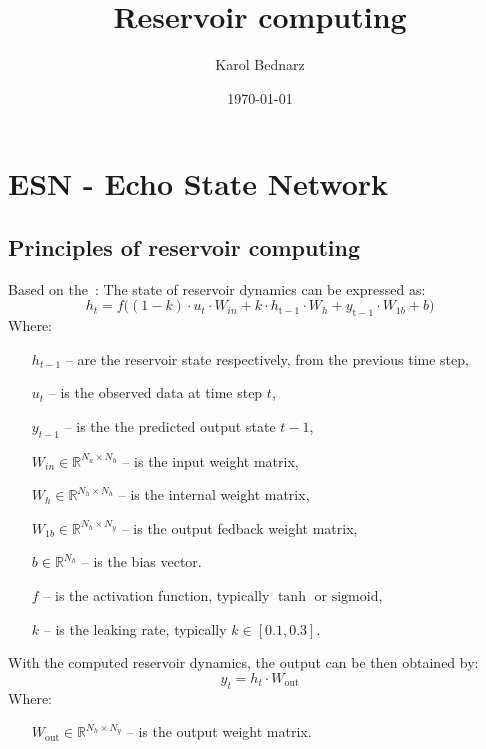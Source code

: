 \documentclass[11pt, oneside]{article}
\title{Reservoir computing}
\author{Karol Bednarz}
\date{\today}
\begin{document}
\maketitle
\tableofcontents

\vspace{.25in}

\newcommand{\Todo}[1]{\textcolor                {red}{\textbf{TODO:} #1}}

\section{ESN - Echo State Network}


\subsection{Principles of reservoir computing}
Based on the~\cite{Bai2023}:
The state of reservoir dynamics can be expressed as:
\begin{equation}
    h_t = f \big((1-k) \cdot u_t \cdot W_{in} + k\cdot h_{\mathrm{t-1}} \cdot W_h + y_{\mathrm{t-1}} \cdot W_{1b} + b \big)
\end{equation}
Where:
\begin{itemize}[noitemsep, leftmargin=4cm, label={}]
    \item [\(h_{t-1}\)] -- are the reservoir state respectively, from the previous time step,
    \item [\(u_t\)] -- is the observed data at time step \(t\),
    \item [\(y_{t-1}\)] -- is the the predicted output state \(t-1\),
    \item [\(W_{in} \in \mathbb{R}^{N_u \times N_h}\)] -- is the input weight matrix,
    \item [\(W_h \in \mathbb{R}^{N_h \times N_h}\)] -- is the internal weight matrix,
    \item [\(W_{1b} \in \mathbb{R}^{N_h \times N_y}\)] -- is the output fedback weight matrix,
    \item [\(b \in \mathbb{R}^{N_h}\)] -- is the bias vector.
    \item [\(f\)] -- is the activation function, typically \(\tanh\) or \(\mathrm{sigmoid}\),
    \item [\(k\)] -- is the leaking rate, typically \(k \in [0.1, 0.3]\).
\end{itemize}


With the computed reservoir dynamics, the output can be then obtained by:
\begin{equation}
    y_t = h_t \cdot W_{\mathrm{out}}
\end{equation}
Where:
\begin{itemize}[noitemsep, leftmargin=4cm, label={}]
    \item [\(W_{\mathrm{out}} \in \mathbb{R}^{N_h \times N_y}\)] -- is the output weight matrix.
\end{itemize}
\end{document}
